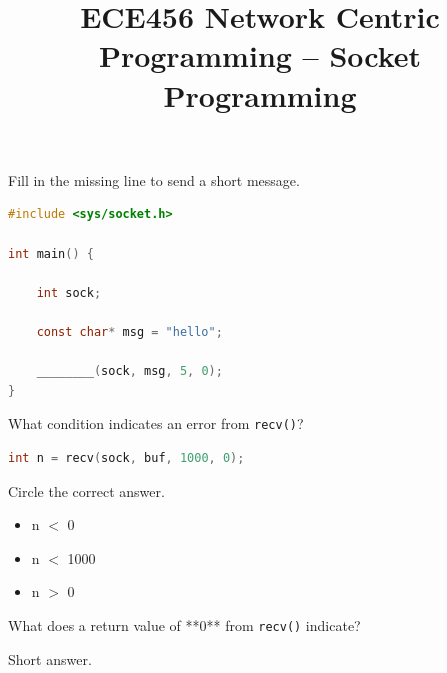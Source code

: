 

\title{ECE456 Network Centric Programming -- Socket Programming}
\date{}
\author{}



\maketitle

\begin{questions}

	\question[6]

	Fill in the missing line to send a short message.

	\begin{lstlisting}[language=C]
#include <sys/socket.h>

int main() {

    int sock;

    const char* msg = "hello";

    ________(sock, msg, 5, 0);
}
\end{lstlisting}

	\vspace{1cm}

	\question[6]

	What condition indicates an error from \texttt{recv()}?

	\begin{lstlisting}[language=C]
int n = recv(sock, buf, 1000, 0);
\end{lstlisting}

	Circle the correct answer.

	\begin{itemize}
		\item n $<$ 0
		\item n $<$ 1000
		\item n $>$ 0
	\end{itemize}

	\vspace{1cm}

	\question[6]

	What does a return value of **0** from \texttt{recv()} indicate?

	Short answer.

	\vspace{2cm}

	\question[8]


\end{questions}
